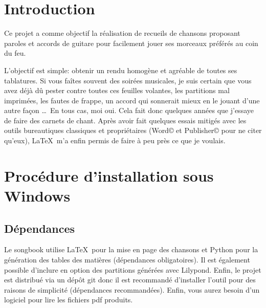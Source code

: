 \documentclass[versionenligne]{framabook}
\begin{document}

\thispagestyle{empty}
\tableofcontents \newpage

\section*{Introduction}

Ce projet a comme objectif la réalisation de recueils de chansons
proposant paroles et accords de guitare pour facilement jouer ses
morceaux préférés au coin du feu.

L'objectif est simple: obtenir un rendu homogène et agréable de toutes
ses tablatures. Si vous faîtes souvent des soirées musicales, je suis
certain que vous avez déjà dû pester contre toutes ces feuilles
volantes, les partitions mal imprimées, les fautes de frappe, un
accord qui sonnerait mieux en le jouant d'une autre façon \dots\,
En tous cas, moi oui. Cela fait donc quelques années que j'essaye de
faire des carnets de chant. Après avoir fait quelques essais mitigés
avec les outils bureautiques classiques et propriétaires (Word© et
Publisher© pour ne citer qu'eux), \LaTeX\, m'a enfin permis de faire à
peu près ce que je voulais.

\section{Procédure d'installation sous Windows}

\subsection{Dépendances}\label{sec:songbook-dep-win}

Le songbook utilise \LaTeX\, pour la mise en page des chansons et Python
pour la génération des tables des matières (dépendances obligatoires).
Il est également possible d'inclure en option des partitions générées
avec Lilypond. Enfin, le projet est distribué via un dépôt git donc il
est recommandé d'installer l'outil pour des raisons de simplicité
(dépendances recommandées). Enfin, vous aurez besoin d'un logiciel
pour lire les fichiers pdf produits.
\end{document}
